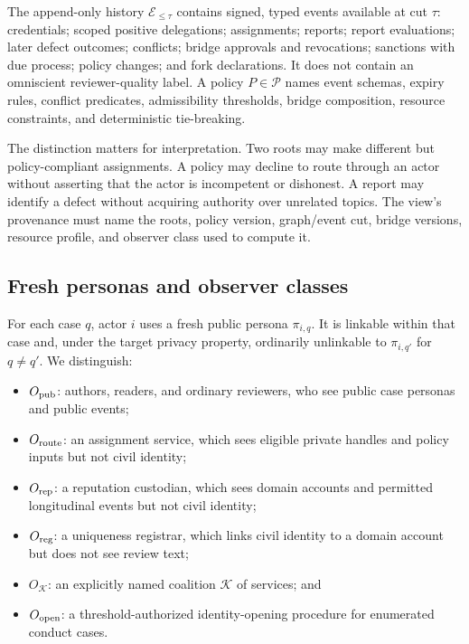 \documentclass[11pt]{article}
\newcommand{\events}{\mathcal{E}}
\newcommand{\policies}{\mathcal{P}}
\begin{document}
The append-only history $\events_{\leq\tau}$ contains signed, typed events available at cut $\tau$: credentials; scoped positive delegations; assignments; reports; report evaluations; later defect outcomes; conflicts; bridge approvals and revocations; sanctions with due process; policy changes; and fork declarations.  It does not contain an omniscient reviewer-quality label.  A policy $P\in\policies$ names event schemas, expiry rules, conflict predicates, admissibility thresholds, bridge composition, resource constraints, and deterministic tie-breaking.


The distinction matters for interpretation.  Two roots may make different but policy-compliant assignments.  A policy may decline to route through an actor without asserting that the actor is incompetent or dishonest.  A report may identify a defect without acquiring authority over unrelated topics.  The view's provenance must name the roots, policy version, graph/event cut, bridge versions, resource profile, and observer class used to compute it.

\subsection{Fresh personas and observer classes}

For each case $q$, actor $i$ uses a fresh public persona $\pi_{i,q}$.  It is linkable within that case and, under the target privacy property, ordinarily unlinkable to $\pi_{i,q'}$ for $q\neq q'$.  We distinguish:
\begin{itemize}
 \item $O_{\rm pub}$: authors, readers, and ordinary reviewers, who see public case personas and public events;
 \item $O_{\rm route}$: an assignment service, which sees eligible private handles and policy inputs but not civil identity;
 \item $O_{\rm rep}$: a reputation custodian, which sees domain accounts and permitted longitudinal events but not civil identity;
 \item $O_{\rm reg}$: a uniqueness registrar, which links civil identity to a domain account but does not see review text;
 \item $O_{\mathcal{K}}$: an explicitly named coalition $\mathcal{K}$ of services; and
 \item $O_{\rm open}$: a threshold-authorized identity-opening procedure for enumerated conduct cases.
\end{itemize}
\end{document}
